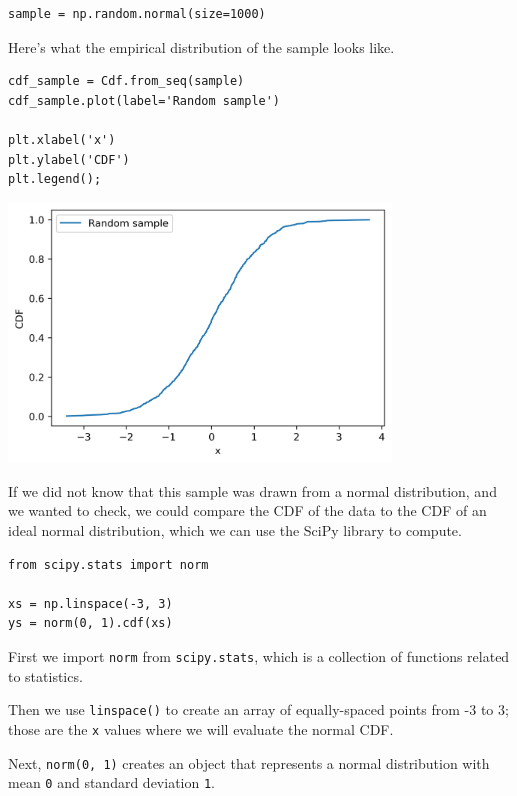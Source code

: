 \begin{lstlisting}[]
sample = np.random.normal(size=1000)
\end{lstlisting}

Here's what the empirical distribution of the sample looks like.

\begin{lstlisting}[]
cdf_sample = Cdf.from_seq(sample)
cdf_sample.plot(label='Random sample')

plt.xlabel('x')
plt.ylabel('CDF')
plt.legend();
\end{lstlisting}

\begin{center}
\includegraphics[width=4in]{chapters/08_distributions_files/08_distributions_109_0.png}
\end{center}

If we did not know that this sample was drawn from a normal
distribution, and we wanted to check, we could compare the CDF of the
data to the CDF of an ideal normal distribution, which we can use the
SciPy library to compute.

\begin{lstlisting}[]
from scipy.stats import norm

xs = np.linspace(-3, 3)
ys = norm(0, 1).cdf(xs)
\end{lstlisting}

First we import \passthrough{\lstinline!norm!} from
\passthrough{\lstinline!scipy.stats!}, which is a collection of
functions related to statistics.

Then we use \passthrough{\lstinline!linspace()!} to create an array of
equally-spaced points from -3 to 3; those are the
\passthrough{\lstinline!x!} values where we will evaluate the normal
CDF.

Next, \passthrough{\lstinline!norm(0, 1)!} creates an object that
represents a normal distribution with mean \passthrough{\lstinline!0!}
and standard deviation \passthrough{\lstinline!1!}.

